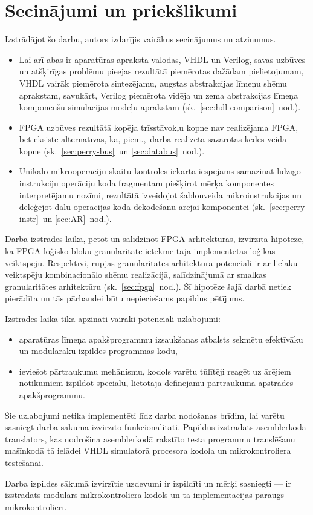 \section*{Secinājumi un priekšlikumi}%
Izstrādājot šo darbu, autors izdarījis vairākus secinājumus un atzinumus.
\begin{itemize}
	\item Lai arī abas ir aparatūras apraksta valodas, VHDL un Verilog,
		savas uzbūves un atšķirīgas problēmu pieejas rezultātā piemērotas
		dažādam pielietojumam, VHDL vairāk piemērota sintezējamu, augstas
		abstrakcijas līmeņu shēmu aprakstam, savukārt, Verilog piemērota
		vidēja un zema abstrakcijas līmeņa komponenšu 
		simulācijas modeļu aprakstam (sk.~\ref{sec:hdl-comparison}~nod.).
	\item FPGA uzbūves rezultātā kopēja trīsstāvokļu kopne nav realizējama
		FPGA, bet eksistē alternatīvas, kā, piem.,~darbā realizētā sazarotās
		ķēdes veida kopne (sk.~\ref{sec:perry-bus}~un \ref{sec:databus}~nod.).
	\item Unikālo mikrooperāciju skaitu kontroles iekārtā iespējams samazināt
		līdzīgo instrukciju operāciju koda fragmentam piešķirot
		mērķa komponentes interpretējamu nozīmi, rezultātā izveidojot šablonveida
		mikroinstrukcijas un deleģējot daļu operācijas koda dekodēšanu ārējai
		komponentei (sk.~\ref{sec:perry-instr}~un \ref{sec:AR}~nod.).
\end{itemize}

Darba izstrādes laikā, pētot un salīdzinot FPGA arhitektūras, 
izvirzīta hipotēze, ka
 FPGA loģisko bloku granularitāte ietekmē tajā implementetās
loģikas veiktspēju. Respektīvi, rupjas granularitātes 
arhitektūra potenciāli ir ar lielāku veiktspēju kombinacionālo shēmu realizācijā,
salīdzinājumā ar smalkas granularitātes arhitektūru (sk.~\ref{sec:fpga}~nod.).
Šī hipotēze šajā darbā netiek pierādīta un
tās pārbaudei būtu nepieciešams papildus pētījums.

Izstrādes laikā tika apzināti
vairāki potenciāli uzlabojumi:
\begin{itemize}
	\item aparatūras līmeņa apakšprogrammu izsaukšanas atbalsts
		sekmētu efektīvāku un modulārāku izpildes programmas kodu,
	\item ieviešot pārtraukumu mehānismu, kodols varētu tūlītēji reaģēt
		uz ārējiem notikumiem 
		izpildot speciālu, lietotāja definējamu pārtraukuma apstrādes apakšprogrammu.
\end{itemize}

Šie uzlabojumi netika implementēti līdz darba nodošanas brīdim,
lai varētu sasniegt darba sākumā izvirzīto funkcionalitāti.
Papildus izstrādāts asemblerkoda translators, kas nodrošina asemblerkodā
rakstīto testa programmu translēšanu mašīnkodā tā ielādei VHDL simulatorā
procesora kodola un mikrokontroliera testēšanai.

Darba izpildes sākumā izvirzītie uzdevumi ir izpildīti un mērķi sasniegti
--- ir izstrādāts modulārs mikrokontroliera kodols un tā implementācijas
paraugs mikrokontrolierī.




